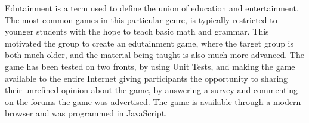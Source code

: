 Edutainment is a term used to define the union of education and entertainment. The most common games in this 
particular genre, is typically restricted to younger students with the hope to teach basic math and grammar. This 
motivated the group to create an edutainment game, where the target group is both much older, and the material being 
taught is also much more advanced. The game has been tested on two fronts, by using Unit Tests, and making the game 
available to the entire Internet giving participants the opportunity to sharing their unrefined opinion about the 
game, by answering a survey and commenting on the forums the game was advertised. The game is available through a modern browser and was programmed in JavaScript.